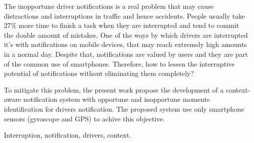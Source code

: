 The inopportune driver notifications is a real problem that may cause distractions and interruptions in traffic and
hence accidents. People usually take 27\% more time to finish a task when they are interrupted and tend to commit the
double amount of mistakes. One of the ways by which drivers are interrupted it's with notifications on mobile devices,
that may reach extremely high amounts in a normal day. Despite that, notifications are valued by users and they are
part of the common use of smartphones. Therefore, how to lessen the interruptive potential of notifications without
eliminating them completely?

To mitigate this problem, the present work propose the development of a context-aware notification system with opportune
and inopportune moments identification for drivers notification. The proposed system use only smartphone sensors (gyroscope
and GPS) to achive this objective.

\begin{keywords}
Interruption, notification, drivers, context.
\end{keywords}
